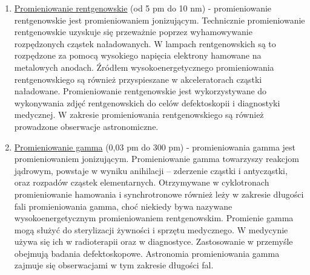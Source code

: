 \begin{enumerate}[-]
	\item \underline{Promieniowanie rentgenowskie} (od 5 pm do 10 nm) - promieniowanie rentgenowskie jest promieniowaniem jonizującym. Technicznie promieniowanie rentgenowskie uzyskuje się przeważnie poprzez wyhamowywanie rozpędzonych cząstek naładowanych. W lampach rentgenowskich są to rozpędzone za pomocą wysokiego napięcia elektrony hamowane na metalowych anodach. Źródłem wysokoenergetycznego promieniowania rentgenowskiego są również przyspieszane w akceleratorach cząstki naładowane. Promieniowanie rentgenowskie jest wykorzystywane do wykonywania zdjęć rentgenowskich do celów defektoskopii i diagnostyki medycznej. W zakresie promieniowania rentgenowskiego są również prowadzone obserwacje astronomiczne. 
	\item \underline{Promieniowanie gamma} (0,03 pm do 300 pm) - promieniowania gamma jest promieniowaniem jonizującym. Promieniowanie gamma towarzyszy reakcjom jądrowym, powstaje w wyniku anihilacji – zderzenie cząstki i antycząstki, oraz rozpadów cząstek elementarnych. Otrzymywane w cyklotronach promieniowanie hamowania i synchrotronowe również leży w zakresie długości fali promieniowania gamma, choć niekiedy bywa nazywane wysokoenergetycznym promieniowaniem rentgenowskim. Promienie gamma mogą służyć do sterylizacji żywności i sprzętu medycznego. W medycynie używa się ich w radioterapii oraz w diagnostyce. Zastosowanie w przemyśle obejmują badania defektoskopowe. Astronomia promieniowania gamma zajmuje się obserwacjami w tym zakresie długości fal. 
\end{enumerate}